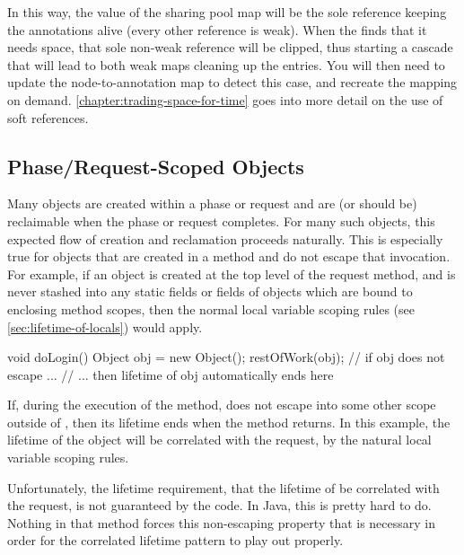 In this way, the value of the sharing pool map will be the sole reference
keeping the annotations alive (every other reference is weak). When the \jre
finds that it needs space, that sole non-weak reference will be clipped, thus
starting a cascade that will lead to both weak maps cleaning up the entries. You
will then need to update the node-to-annotation map to detect this case, and
recreate the mapping on demand. \autoref{chapter:trading-space-for-time} goes
into more detail on the use of soft references.

\subsection{Phase/Request-Scoped Objects}

Many objects are created within a phase or request and are (or should be)
reclaimable when the phase or request completes. For many such objects, this
expected flow of creation and reclamation proceeds naturally. This is especially
true for objects that are created in a method and do not escape that invocation.
For example, if an object is created at the top level of the request method, and
is never stashed into any static fields or fields of objects which are bound to
enclosing method scopes, then the normal local variable scoping rules (see
\autoref{sec:lifetime-of-locals}) would apply.
\begin{figurelisting}
    void doLogin() {
      Object obj = new Object();
      restOfWork(obj); // if obj does not escape ...
    } // ... then lifetime of obj automatically ends here
\end{figurelisting}
If, during the execution of the  method,  does not
escape into some other scope outside of , then its lifetime ends
when the  method returns. In this example, the lifetime of the object  will be
correlated with the  request, by the natural local variable
scoping rules.

Unfortunately, the lifetime requirement, that the lifetime of  be
correlated with the  request, is not guaranteed by the code. In
Java, this is pretty hard to do. Nothing in that  method forces
this non-escaping property that is necessary in order for the correlated
lifetime pattern to play out properly. 


